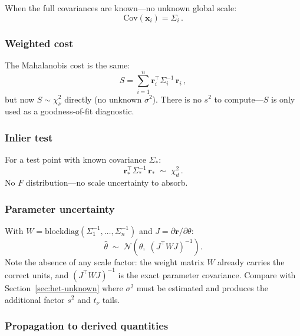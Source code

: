 \documentclass[11pt]{article}
\newcommand{\Normal}{\mathcal{N}}
\begin{document}
When the full covariances are known---no unknown global scale:
\begin{equation}
  \mathrm{Cov}(\mathbf{x}_i) = \Sigma_i\,.
\end{equation}

\subsubsection{Weighted cost}

The Mahalanobis cost is the same:
\begin{equation}
  S = \sum_{i=1}^{n} \mathbf{r}_i^\top \Sigma_i^{-1}\, \mathbf{r}_i\,,
\end{equation}
but now $S \sim \chi^2_\nu$ directly (no unknown $\sigma^2$).
There is no $s^2$ to compute---$S$ is only used as a goodness-of-fit
diagnostic.

\subsubsection{Inlier test}

For a test point with known covariance $\Sigma_*$:
\begin{equation}
  \boxed{
    \mathbf{r}_*^\top \Sigma_*^{-1}\, \mathbf{r}_*
    \;\sim\; \chi^2_d\,.
  }
\end{equation}
No $F$ distribution---no scale uncertainty to absorb.

\subsubsection{Parameter uncertainty}

With $W = \mathrm{blockdiag}(\Sigma_1^{-1}, \ldots, \Sigma_n^{-1})$ and
$J = \partial \mathbf{r} / \partial \theta$:
\begin{equation}
  \boxed{
    \hat\theta \;\sim\; \Normal\!\left(\theta,\; (J^\top W J)^{-1}\right).
  }
\end{equation}
Note the absence of any scale factor: the weight matrix $W$ already
carries the correct units, and $(J^\top W J)^{-1}$ is the exact
parameter covariance. Compare with Section~\ref{sec:het-unknown}
where $\sigma^2$ must be estimated and produces the additional
factor $s^2$ and $t_\nu$ tails.

\subsubsection{Propagation to derived quantities}
\end{document}
